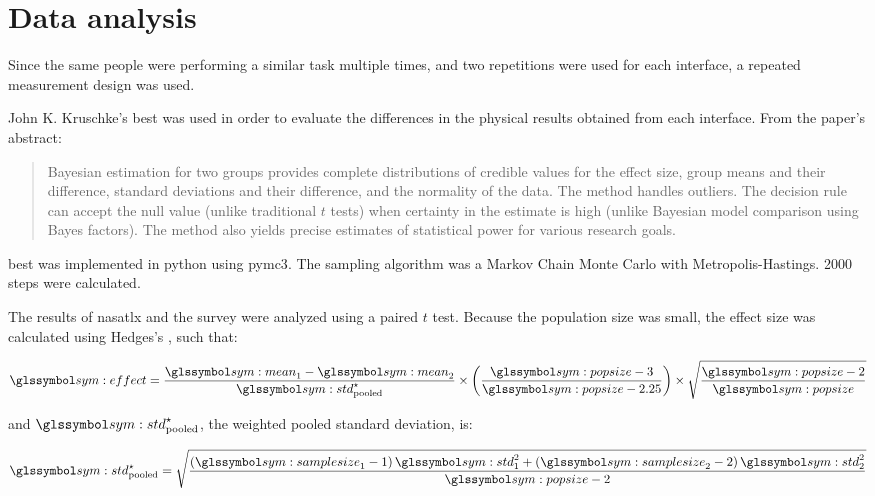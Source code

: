 \section{Data analysis}
  Since the same people were performing a similar task multiple times, and two repetitions were used for each interface, a repeated measurement design was used.
  
  John K. Kruschke's \gls{best}\cite{kruschke2013} was used in order to evaluate the differences in the physical results obtained from each interface.
  From the paper's abstract:
  
  \begin{quote}
    Bayesian estimation for two groups provides complete distributions of credible values for the effect size, group means and their difference, standard deviations and their difference, and the normality of the data.
    The method handles outliers.
    The decision rule can accept the null value (unlike traditional $t$ tests) when certainty in the estimate is high (unlike Bayesian model comparison using Bayes factors).
    The method also yields precise estimates of statistical power for various research goals.
  \end{quote}

  \gls{best} was implemented in \gls{python} using \gls{pymc3}.
  The sampling algorithm was a Markov Chain Monte Carlo with Metropolis-Hastings.
  2000 steps were calculated.

  The results of \gls{nasatlx} and the survey were analyzed using a paired $t$ test. Because the population size was small, the effect size was calculated using Hedges's , such that:

  \begin{equation}
    \sym{effect} = \frac{\sym{mean}_1 - \sym{mean}_2}{\sym{std}^\star_\mathrm{pooled}} \times \left(\frac{\sym{popsize} - 3}{\sym{popsize}-2.25}\right) \times \sqrt{\frac{\sym{popsize}-2}{\sym{popsize}}}
  \end{equation}

  \noindent and $\sym{std}^\star_\mathrm{pooled}$, the weighted pooled standard deviation, is:

  \begin{equation}
    \sym{std}^\star_\mathrm{pooled} = \sqrt{\frac{\left(\sym{samplesize}_1-1\right) \sym{std}_1^2 + \left(\sym{samplesize}_2-2\right)\sym{std}_2^2}{\sym{popsize}-2}}
  \end{equation}

